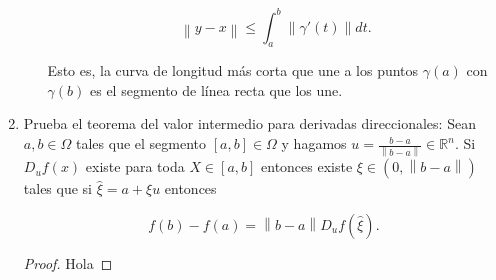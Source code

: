 \documentclass[letterpaper]{article}
\theoremstyle{definition}
\theoremstyle{lemathm}
\theoremstyle{lemathm}
\theoremstyle{lemademthm}
\newcommand{\pars}[1]{\left( #1 \right) }
\newcommand{\bracs}[1]{\left[ #1 \right] }
\newcommand{\norm}[1]{\left\lVert#1\right\rVert}
\newcommand{\R}{\mathbb{R}}
\newcommand{\1}{\mathbbm{1}}
\begin{document}
\begin{enumerate}
\begin{enumerate}
			\[\norm{y-x} \leq \int_{a}^{b}\norm{\gamma'(t)} dt.\]

			Esto es, la curva de longitud más corta que une a los puntos $\gamma(a)$ con $\gamma(b)$ es el segmento de línea recta que los une.

		\end{enumerate}

		\item Prueba el teorema del valor intermedio para derivadas direccionales: Sean $a,b \in \Omega$ tales que el segmento $\bracs{a,b}\in\Omega$ y hagamos $u = \frac{b-a}{\norm{b-a}} \in \R^n$. Si $D_uf(x)$ existe para toda $X \in \bracs{a,b}$ entonces existe $\xi \in \pars{0,\norm{b-a}}$ tales que si $\widehat{\xi} = a + \xi u$ entonces
		
		\[f(b)-f(a) = \norm{b-a} D_uf(\widehat{\xi}).\]

		\begin{proof}
			Hola
		\end{proof}

    \end{enumerate}

	
\end{document}
